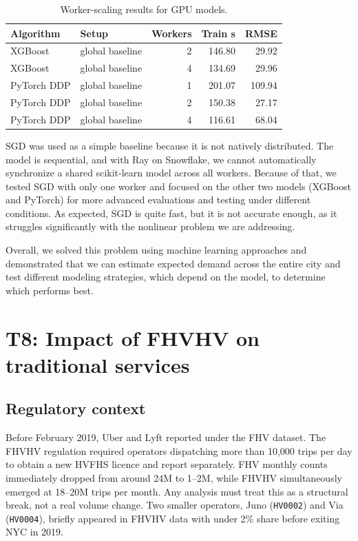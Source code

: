 \documentclass[fleqn,moreauthors,9pt]{ds_report}
\begin{document}
\begin{table}[h]
\centering
\caption{Worker-scaling results for GPU models.}
\label{tab:t7scaling}
\scriptsize
\begin{tabular*}{\columnwidth}{@{\extracolsep{\fill}}llrrr}
\toprule
Algorithm & Setup & Workers & Train s & RMSE \\
\midrule
XGBoost & global baseline & 2 & 146.80 & 29.92 \\
XGBoost & global baseline & 4 & 134.69 & 29.96 \\
PyTorch DDP & global baseline & 1 & 201.07 & 109.94 \\
PyTorch DDP & global baseline & 2 & 150.38 & 27.17 \\
PyTorch DDP & global baseline & 4 & 116.61 & 68.04 \\
\bottomrule
\end{tabular*}
\end{table}

SGD was used as a simple baseline because it is not natively distributed. The model is sequential, and with Ray on Snowflake, we cannot automatically synchronize a shared scikit-learn model across all workers. Because of that, we tested SGD with only one worker and focused on the other two models (XGBoost and PyTorch) for more advanced evaluations and testing under different conditions. As expected, SGD is quite fast, but it is not accurate enough, as it struggles significantly with the nonlinear problem we are addressing.

Overall, we solved this problem using machine learning approaches and demonstrated that we can estimate expected demand across the entire city and test different modeling strategies, which depend on the model, to determine which performs best.\\


\section*{T8: Impact of FHVHV on traditional services}

\subsection*{Regulatory context}

Before February 2019, Uber and Lyft reported under the FHV dataset. The FHVHV regulation required operators dispatching more than 10,000 trips per day to obtain a new HVFHS licence and report separately. FHV monthly counts immediately dropped from around 24M to 1--2M, while FHVHV simultaneously emerged at 18--20M trips per month. Any analysis must treat this as a structural break, not a real volume change. Two smaller operators, Juno (\texttt{HV0002}) and Via (\texttt{HV0004}), briefly appeared in FHVHV data with under 2\% share before exiting NYC in 2019.
\end{document}
